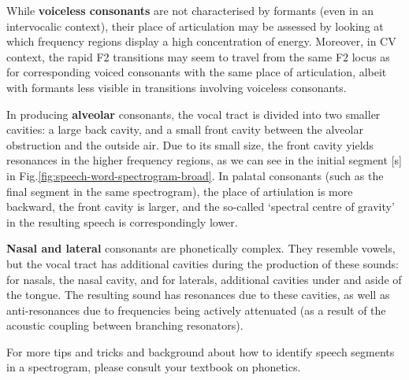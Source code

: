 \documentclass[
]{book}
\begin{document}
While \textbf{voiceless consonants} are not characterised by formants (even in an intervocalic context), their place of articulation may be assessed by looking at which frequency regions display a high concentration of energy. Moreover, in CV context, the rapid F2 transitions may seem to travel from the same F2 locus as for corresponding voiced consonants with the same place of articulation, albeit with formants less visible in transitions involving voiceless consonants.

In producing \textbf{alveolar} consonants, the vocal tract is divided into two smaller cavities: a large back cavity, and a small front cavity between the alveolar obstruction and the outside air. Due to its small size, the front cavity yields resonances in the higher frequency regions, as we can see in the initial segment {[}s{]} in Fig.\ref{fig:speech-word-spectrogram-broad}. In palatal consonants (such as the final segment in the same spectrogram), the place of artiulation is more backward, the front cavity is larger, and the so-called `spectral centre of gravity' in the resulting speech is correspondingly lower.

\textbf{Nasal and lateral} consonants are phonetically complex. They resemble vowels, but the vocal tract has additional cavities during the production of these sounds: for nasals, the nasal cavity, and for laterals, additional cavities under and aside of the tongue. The resulting sound has resonances due to these cavities, as well as anti-resonances due to frequencies being actively attenuated (as a result of the acoustic coupling between branching resonators).

For more tips and tricks and background about how to identify speech segments in a spectrogram, please consult your textbook on phonetics.

  
\end{document}
